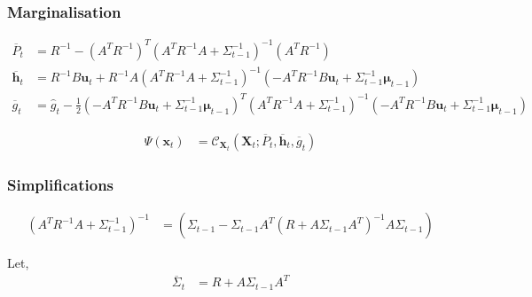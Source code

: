 \subsubsection{Marginalisation}
\label{subsubsection:marginalisation}

\begin{align}
\overline{P}_{t} &= R^{-1} - \left( A^{T} R^{-1} \right)^{T} \left( A^{T} R^{-1} A + \Sigma_{t-1}^{-1} \right)^{-1} \left( A^{T} R^{-1} \right) \\
\overline{\pmb{h}}_{t} &= R^{-1} B \pmb{u}_{t} + R^{-1}A \left(A^{T} R^{-1} A + \Sigma^{-1}_{t-1} \right)^{-1} \left( -A^{T} R^{-1} B \pmb{u}_{t} + \Sigma^{-1}_{t-1} \pmb{\mu}_{t-1} \right) \\
\overline{g}_{t} &= \hat{g}_{t} -\frac{1}{2} \left( -A^{T} R^{-1} B \pmb{u}_{t} + \Sigma^{-1}_{t-1} \pmb{\mu}_{t-1} \right)^{T} \left(A^{T} R^{-1} A + \Sigma^{-1}_{t-1} \right)^{-1} \left( -A^{T} R^{-1} B \pmb{u}_{t} + \Sigma^{-1}_{t-1} \pmb{\mu}_{t-1} \right) \nonumber
\end{align}

\begin{align}
\Psi({\pmb{x}_{t}}) &= \mathcal{C}_{\pmb{X}_{t}} \left( \pmb{X}_{t}; \overline{P}_t, \overline{\pmb{h}}_{t}, \overline{g}_{t} \right)
\end{align}

\subsubsection{Simplifications}
\label{subsubsection:simplification}


\begin{align}
\left( A^{T} R^{-1} A + \Sigma^{-1}_{t-1} \right)^{-1} &= \left( \Sigma_{t-1} - \Sigma_{t-1} A^{T} \left( R + A \Sigma_{t-1} A^{T} \right)^{-1} A \Sigma_{t-1} \right) 
\end{align}

Let,
\begin{align}
\overline{\Sigma}_{t} &= R + A \Sigma_{t-1} A^{T}
\end{align}

